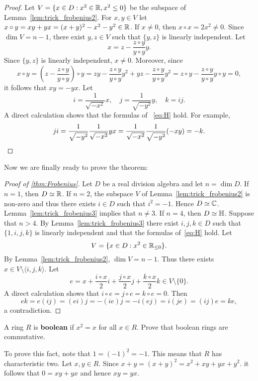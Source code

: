 \begin{proof}
	Let $V=\{x\in D:x^2\in\mathbb{R},x^2\leq 0\}$ be the subspace of Lemma~\ref{lem:trick_frobenius2}. 
	For $x,y\in V$ let $x\circ
	y=xy+yx=(x+y)^2-x^2-y^2\in\mathbb{R}$. If $x\ne0$, then $x\circ
	x=2x^2\ne0$. Since $\dim V=n-1$, there exist $y,z\in V$ such that $\{y,z\}$ is 
	linearly independent. Let 
	\[
		x=z-\frac{z\circ y}{y\circ y}y.
	\]
	Since $\{y,z\}$ is linearly independent, $x\ne0$. Moreover, since 
	\[
		x\circ y
		=\left(z-\frac{z\circ y}{y\circ y}\right)\circ y
		=zy-\frac{z\circ y}{y\circ y}y^2+yz-\frac{z\circ y}{y\circ y}y^2
		=z\circ y-\frac{z\circ y}{y\circ y}y\circ y=0,
	\]
	it follows that $xy=-yx$. 
	Let  
	\[
		i=\frac{1}{\sqrt{-x^2}}x,
		\quad
		j=\frac{1}{\sqrt{-y^2}}y,
		\quad
		k=ij. 
	\]
	A direct calculation shows that the formulas of ~\eqref{eq:H} hold. For example, 
	\[
		ji=\frac{1}{\sqrt{-y^2}}\frac{1}{\sqrt{-x^2}}yx=\frac{1}{\sqrt{-x^2}}\frac{1}{\sqrt{-y^2}}(-xy)=-k.\qedhere
	\]
\end{proof}

Now we are finally 
ready to prove the theorem: 

\begin{proof}[Proof of \ref{thm:Frobenius}]
	Let $D$ be a real division algebra and let $n=\dim D$. If $n=1$, then 
	$D\simeq\mathbb{R}$. If $n=2$, the subspace $V$ of Lemma~\ref{lem:trick_frobenius2} 
	is non-zero and thus there exists $i\in D$ such that 
	$i^2=-1$. Hence $D\simeq\mathbb{C}$. Lemma~\ref{lem:trick_frobenius3}
	implies that $n\ne3$. If $n=4$, then $D\simeq\mathbb{H}$. Suppose that 
	$n>4$.  By Lemma~\ref{lem:trick_frobenius3} there exist
	$i,j,k\in D$ such that $\{1,i,j,k\}$ is linearly independent 
	and that the formulas of~\eqref{eq:H} hold. Let 
	\[
		V=\{x\in D:x^2\in\mathbb{R}_{\leq0}\}.
	\]
	By Lemma~\ref{lem:trick_frobenius2}, $\dim V=n-1$. Thus there exists 
	$x\in V\setminus\langle i,j,k\rangle$. Let 
	\[
		e=x+\frac{i\circ x}{2}i+\frac{j\circ x}{2}j+\frac{k\circ x}{2}k\in V\setminus\{0\}.
	\]
	A direct calculation shows that $i\circ e=j\circ e=k\circ e=0$. Then 
	\[
		ek=e(ij)=(ei)j=-(ie)j=-i(ej)=i(je)=(ij)e=ke,
	\]
	a contradiction. 
\end{proof}


\begin{exercise}
    A ring $R$ is \textbf{boolean} if $x^2=x$ for all $x\in R$. 
    Prove that boolean rings are commutative. 
\end{exercise}

To prove this fact, note that $1=(-1)^2=-1$. This means that $R$ has
characteristic two. Let $x,y\in R$. Since $x+y=(x+y)^2=x^2+xy+yx+y^2$. 
it follows that $0=xy+yx$ and hence $xy=yx$.

